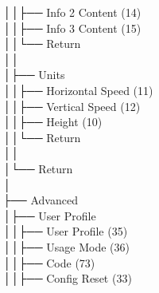 │\hspace{2em}│\hspace{2em}├── Info 2 Content (14) \\
│\hspace{2em}│\hspace{2em}├── Info 3 Content (15) \\
│\hspace{2em}│\hspace{2em}└── Return \\
│\hspace{2em}│\hspace{2em} \\
│\hspace{2em}├── Units \\
│\hspace{2em}│\hspace{2em}├── Horizontal Speed (11) \\
│\hspace{2em}│\hspace{2em}├── Vertical Speed (12) \\
│\hspace{2em}│\hspace{2em}├── Height (10) \\
│\hspace{2em}│\hspace{2em}└── Return \\
│\hspace{2em}│\hspace{2em} \\
│\hspace{2em}└── Return \\
│\hspace{2em} \\
├── Advanced \\
│\hspace{2em}├── User Profile \\
│\hspace{2em}│\hspace{2em}├── User Profile (35) \\
│\hspace{2em}│\hspace{2em}├── Usage Mode (36) \\
│\hspace{2em}│\hspace{2em}├── Code (73) \\
│\hspace{2em}│\hspace{2em}├── Config Reset (33) \\
